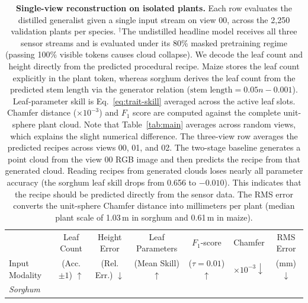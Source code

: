 \documentclass[10pt,twocolumn,letterpaper]{article}
\begin{document}
\begin{table}[t]
  \caption{\textbf{Single-view reconstruction on isolated plants.} Each row evaluates the distilled generalist given a single input stream on view 00, across the 2{,}250 validation plants per species. $^{\dagger}$The undistilled headline model receives all three sensor streams and is evaluated under its 80\% masked pretraining regime (passing 100\% visible tokens causes cloud collapse). We decode the leaf count and height directly from the predicted procedural recipe. Maize stores the leaf count explicitly in the plant token, whereas sorghum derives the leaf count from the predicted stem length via the generator relation ($\text{stem length} = 0.05n - 0.001$). Leaf-parameter skill is Eq.~\eqref{eq:trait-skill} averaged across the active leaf slots. Chamfer distance ($\times 10^{-3}$) and $F_1$ score are computed against the complete unit-sphere plant cloud. Note that Table~\ref{tab:main} averages across random views, which explains the slight numerical difference. The three-view row averages the predicted recipes across views 00, 01, and 02. The two-stage baseline generates a point cloud from the view 00 RGB image and then predicts the recipe from that generated cloud. Reading recipes from generated clouds loses nearly all parameter accuracy (the sorghum leaf skill drops from 0.656 to $-0.010$). This indicates that the recipe should be predicted directly from the sensor data. The RMS error converts the unit-sphere Chamfer distance into millimeters per plant (median plant scale of 1.03\,m in sorghum and 0.61\,m in maize).}
  \label{tab:regime1}
  \centering\scriptsize
  \setlength{\tabcolsep}{4.5pt}
  \begin{tabular}{l cc c ccc}
    \toprule
    & Leaf Count & Height Error & Leaf Parameters & $F_1$-score & Chamfer & RMS Error \\
    Input Modality & (Acc. $\pm 1$) $\uparrow$ & (Rel. Err.) $\downarrow$ & (Mean Skill) $\uparrow$ & ($\tau=0.01$) $\uparrow$ & $\times10^{-3}\downarrow$ & (mm) $\downarrow$ \\
    \midrule
    \multicolumn{7}{l}{\emph{Sorghum}} \\

\end{tabular}
\end{table}
\end{document}
